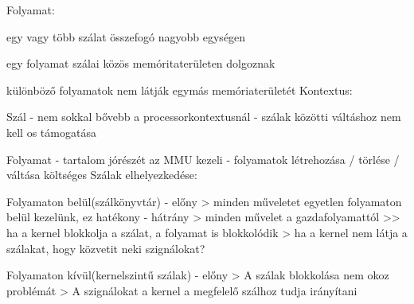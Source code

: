 \documentclass[12pt]{article}
\begin{document}
\begin{description}
                                                                        Folyamat:
                                                                    \item egy vagy több szálat összefogó nagyobb egységen
                                                                    \item egy folyamat szálai közös memóritaterületen dolgoznak
                                                                    \item különböző folyamatok nem látják egymás memóriaterületét
                                                                        Kontextus:
                                                                    \item Szál
                                                                        - nem sokkal bővebb a processorkontextusnál
                                                                        - szálak közötti váltáshoz nem kell os támogatása
                                                                    \item Folyamat
                                                                        - tartalom jórészét az MMU kezeli
                                                                        - folyamatok létrehozása / törlése / váltása költséges 
                                                                        Szálak elhelyezkedése:
                                                                    \item Folyamaton belül(szálkönyvtár)
                                                                        - előny
                                                                        > minden műveletet egyetlen folyamaton belül kezelünk, ez hatékony
                                                                        - hátrány
                                                                        > minden művelet a gazdafolyamattól >> ha a kernel blokkolja a szálat, a folyamat is blokkolódik
                                                                        > ha a kernel nem látja a szálakat, hogy közvetit neki szignálokat?
                                                                    \item Folyamaton kívül(kernelszintű szálak)
                                                                        - előny
                                                                        > A szálak blokkolása nem okoz problémát
                                                                        > A szignálokat a kernel a megfelelő szálhoz tudja irányítani

\end{description}
\end{document}

